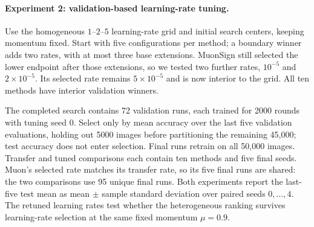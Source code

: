 \paragraph{Experiment 2: validation-based learning-rate tuning.}
Use the homogeneous $1$--$2$--$5$ learning-rate grid and initial search centers,
keeping momentum fixed. Start with five configurations per method; a boundary
winner adds two rates, with at most three base extensions. MuonSign still
selected the lower endpoint after those extensions, so we tested two further
rates, $10^{-5}$ and $2\times10^{-5}$. Its selected rate remains
$5\times10^{-5}$ and is now interior to the grid. All ten methods have
interior validation winners.

The completed search contains 72 validation runs, each trained for 2000
rounds with tuning seed 0. Select only by mean accuracy over the last five
validation evaluations, holding out 5000 images before partitioning the
remaining 45,000; test accuracy does not enter selection. Final runs retrain
on all 50,000 images. Transfer and tuned comparisons each contain ten methods
and five final seeds. Muon's selected rate matches its transfer rate, so its
five final runs are shared: the two comparisons use 95 unique final runs.
Both experiments report the last-five test mean as mean $\pm$ sample
standard deviation over paired seeds $0,\ldots,4$. The retuned learning
rates test whether the heterogeneous ranking survives learning-rate selection
at the same fixed momentum $\mu=0.9$.

